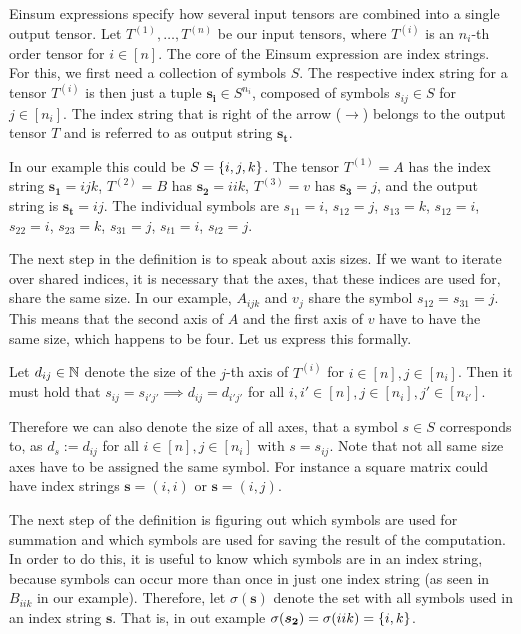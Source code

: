 \begin{definition}
    Einsum expressions specify how several input tensors are combined into a single output tensor.
    Let $T^{(1)},\dots,T^{(n)}$ be our input tensors,
    where $T^{(i)}$ is an $n_i$-th order tensor for $i \in [n]$.
    The core of the Einsum expression are index strings. For this, we first need a collection of symbols $S$.
    The respective index string for a tensor $T^{(i)}$ is then just a tuple $\bm{s_i} \in S^{n_i}$,
    composed of symbols $s_{ij} \in S$ for $j \in [n_i]$.
    The index string that is right of the arrow ($\rightarrow$) belongs to the output tensor $T$ and is referred to as output string $\bm{s_t}$.

    In our example this could be $S = \lbrace i,j,k \rbrace$.
    The tensor $T^{(1)} = A$ has the index string $\bm{s_1} = ijk$,
    $T^{(2)} = B$ has $\bm{s_2} = iik$,
    $T^{(3)} = v$ has $\bm{s_3} = j$,
    and the output string is $\bm{s_t} = ij$.
    The individual symbols are $s_{11} = i$, $s_{12} = j$, $s_{13} = k$, $s_{12} = i$, $s_{22} = i$, $s_{23} = k$, $s_{31} = j$, $s_{t1} = i$, $s_{t2} = j$.

    The next step in the definition is to speak about axis sizes.
    If we want to iterate over shared indices, it is necessary that the axes, that these indices are used for, share the same size.
    In our example, $A_{ijk}$ and $v_j$ share the symbol $s_{12} = s_{31} = j$.
    This means that the second axis of $A$ and the first axis of $v$ have to have the same size, which happens to be four.
    Let us express this formally.

    Let $d_{ij} \in \mathbb{N}$ denote the size of the $j$-th axis of $T^{(i)}$ for $i \in [n], j \in [n_i]$.
    Then it must hold that $s_{ij} = s_{i'j'} \implies d_{ij} = d_{i'j'}$ for all $i,i' \in [n], j \in [n_i], j' \in [n_{i'}]$.

    Therefore we can also denote the size of all axes, that a symbol $s \in S$ corresponds to, as $d_s := d_{ij}$ for all $i \in [n], j \in [n_i]$ with $s = s_{ij}$.
    Note that not all same size axes have to be assigned the same symbol. For instance a square matrix could have index strings $\bm{s} = (i, i)$ or $\bm{s} = (i, j)$.

    The next step of the definition is figuring out which symbols are used for summation and which symbols are used for saving the result of the computation.
    In order to do this, it is useful to know which symbols are in an index string, because symbols can occur more than once in just one index string (as seen in $B_{iik}$ in our example).
    Therefore, let $\sigma(\bm{s})$ denote the set with all symbols used in an index string $\bm{s}$.
    That is, in out example $\sigma(\bm{s_2}) = \sigma(iik) = \lbrace i, k \rbrace$.


\end{definition}
